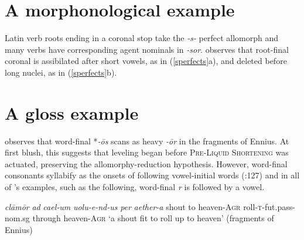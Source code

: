 \documentclass[draft,12pt]{article}
\begin{document}
\section{A morphonological example}

Latin verb roots ending in a coronal stop take the \emph{-s-} perfect allomorph and many verbs have corresponding agent nominals in \emph{-sor}. \citet{Heslin1987} observes that root-final coronal is assibilated after short vowels, as in (\ref{sperfects}a), and deleted before long nuclei, as in (\ref{sperfects}b).


\section{A gloss example}

\citet{Albright2005} observes that word-final *\emph{-ōs} scans as heavy \emph{-ōr} in the fragments of Ennius. 
At first blush, this suggests that leveling began before \textsc{Pre-Liquid Shortening} was actuated, preserving the allomorphy-reduction hypothesis.
However, word-final consonants syllabify as the onsets of following vowel-initial words (\citealt{Allen1978}:127) and in all of \citeauthor{Albright2005}'s examples, such as the following, word-final \emph{r} is followed by a vowel.

\begin{example}
\gll \emph{clāmōr} \emph{ad} \emph{cael-um}      \emph{uolu-e-nd-us}             \emph{per} \emph{aether-a}
     shout         to        heaven-\textsc{Agr} roll-\textsc{t}-fut.pass-nom.sg through    heaven-\textsc{Agr}
\glt `a shout fit to roll up to heaven' (fragments of Ennius)
\glend
\end{example}
\end{document}
